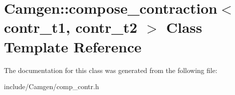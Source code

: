\hypertarget{a00093}{}\section{Camgen\+:\+:compose\+\_\+contraction$<$ contr\+\_\+t1, contr\+\_\+t2 $>$ Class Template Reference}
\label{a00093}


The documentation for this class was generated from the following file\+:\begin{DoxyCompactItemize}
\item 
include/\+Camgen/comp\+\_\+contr.\+h\end{DoxyCompactItemize}

